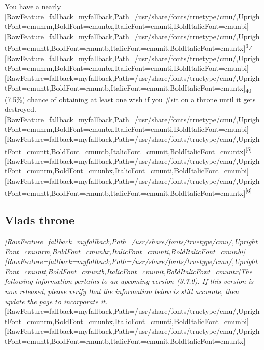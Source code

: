 You have a nearly \allowbreak{}\setmainfont{cmunrm.ttf}[RawFeature={fallback=myfallback},Path=/usr/share/fonts/truetype/cmu/,UprightFont=cmunrm,BoldFont=cmunbx,ItalicFont=cmunti,BoldItalicFont=cmunbi]\setmonofont{cmunrm.ttf}[RawFeature={fallback=myfallback},Path=/usr/share/fonts/truetype/cmu/,UprightFont=cmuntt,BoldFont=cmuntb,ItalicFont=cmunit,BoldItalicFont=cmuntx]\textsuperscript{3}⁄\allowbreak{}\setmainfont{cmunrm.ttf}[RawFeature={fallback=myfallback},Path=/usr/share/fonts/truetype/cmu/,UprightFont=cmunrm,BoldFont=cmunbx,ItalicFont=cmunti,BoldItalicFont=cmunbi]\setmonofont{cmunrm.ttf}[RawFeature={fallback=myfallback},Path=/usr/share/fonts/truetype/cmu/,UprightFont=cmuntt,BoldFont=cmuntb,ItalicFont=cmunit,BoldItalicFont=cmuntx]\textsubscript{40} (7.5\%) chance of obtaining at least one wish\footnotemark[66] if you \#sit\footnotemark[67] on a throne until it gets destroyed.\allowbreak{}\setmainfont{cmunrm.ttf}[RawFeature={fallback=myfallback},Path=/usr/share/fonts/truetype/cmu/,UprightFont=cmunrm,BoldFont=cmunbx,ItalicFont=cmunti,BoldItalicFont=cmunbi]\setmonofont{cmunrm.ttf}[RawFeature={fallback=myfallback},Path=/usr/share/fonts/truetype/cmu/,UprightFont=cmuntt,BoldFont=cmuntb,ItalicFont=cmunit,BoldItalicFont=cmuntx]\textsuperscript{{$\text{[}$}5{$\text{]}$}}\allowbreak{}\setmainfont{cmunrm.ttf}[RawFeature={fallback=myfallback},Path=/usr/share/fonts/truetype/cmu/,UprightFont=cmunrm,BoldFont=cmunbx,ItalicFont=cmunti,BoldItalicFont=cmunbi]\setmonofont{cmunrm.ttf}[RawFeature={fallback=myfallback},Path=/usr/share/fonts/truetype/cmu/,UprightFont=cmuntt,BoldFont=cmuntb,ItalicFont=cmunit,BoldItalicFont=cmuntx]\textsuperscript{{$\text{[}$}6{$\text{]}$}}



\subsection{Vlad\textquotesingle{}s throne}
\label{3}

{\itshape \allowbreak{}\setmainfont{cmunti.ttf}[RawFeature={fallback=myfallback},Path=/usr/share/fonts/truetype/cmu/,UprightFont=cmunrm,BoldFont=cmunbx,ItalicFont=cmunti,BoldItalicFont=cmunbi]\setmonofont{cmunti.ttf}[RawFeature={fallback=myfallback},Path=/usr/share/fonts/truetype/cmu/,UprightFont=cmuntt,BoldFont=cmuntb,ItalicFont=cmunit,BoldItalicFont=cmuntx]\itshape The following information pertains to an upcoming version (3.7.0\footnotemark[68]). If this version is now released, please verify that the information below is still accurate, then update the page to incorporate it.}\allowbreak{}\setmainfont{cmunrm.ttf}[RawFeature={fallback=myfallback},Path=/usr/share/fonts/truetype/cmu/,UprightFont=cmunrm,BoldFont=cmunbx,ItalicFont=cmunti,BoldItalicFont=cmunbi]\setmonofont{cmunrm.ttf}[RawFeature={fallback=myfallback},Path=/usr/share/fonts/truetype/cmu/,UprightFont=cmuntt,BoldFont=cmuntb,ItalicFont=cmunit,BoldItalicFont=cmuntx]




